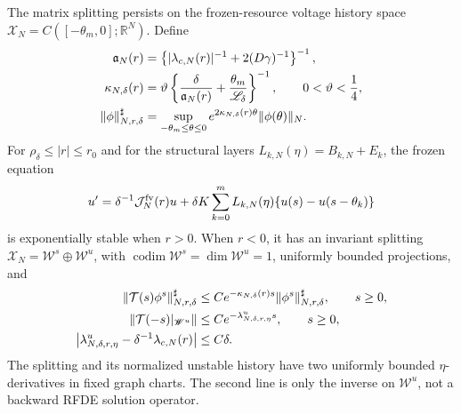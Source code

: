 \begin{proposition}
The matrix splitting persists on the frozen-resource voltage history space
\(\mathscr X_N=C([-\theta_m,0];\mathbb R^N)\).  Define
\begin{align}
 \mathfrak a_N(r)&=
 \left\{|\lambda_{c,N}(r)|^{-1}+2(D\gamma)^{-1}\right\}^{-1},\notag\\
 \kappa_{N,\delta}(r)&=\vartheta
 \left\{\frac\delta{\mathfrak a_N(r)}
          +\frac{\theta_m}{\mathscr L_\delta}\right\}^{-1},
 \qquad 0<\vartheta<\frac14,\notag\\
 \|\phi\|_{N,r,\delta}^{\sharp}
 &=\sup_{-\theta_m\le\theta\le0}
       e^{2\kappa_{N,\delta}(r)\theta}\|\phi(\theta)\|_N.
 \label{eq:anchor-toolkit-fading-norm}
\end{align}
For \(\rho_\delta\le|r|\le r_0\) and for the structural layers
\(L_{k,N}(\eta)=B_{k,N}+E_k\), the frozen equation
\begin{equation}
 u'=\delta^{-1}\mathcal J_N^{\rm fv}(r)u
 +\delta K\sum_{k=0}^mL_{k,N}(\eta)
       \{u(s)-u(s-\theta_k)\}
 \label{eq:anchor-toolkit-frozen-rfde}
\end{equation}
is exponentially stable when \(r>0\).  When \(r<0\), it has an invariant
splitting \(\mathscr X_N=\mathscr W^s\oplus\mathscr W^u\), with
\(\operatorname{codim}\mathscr W^s=\dim\mathscr W^u=1\), uniformly bounded
projections, and
\begin{align}
 \|\mathcal T(s)\phi^s\|_{N,r,\delta}^{\sharp}
 &\le Ce^{-\kappa_{N,\delta}(r)s}
       \|\phi^s\|_{N,r,\delta}^{\sharp},\qquad s\ge0,\notag\\
 \|\mathcal T(-s)|_{\mathscr W^u}\|
 &\le Ce^{-\lambda^u_{N,\delta,r,\eta}s},\qquad s\ge0,\notag\\
 \left|\lambda^u_{N,\delta,r,\eta}
       -\delta^{-1}\lambda_{c,N}(r)\right|&\le C\delta.
 \label{eq:anchor-toolkit-frozen-history-bounds}
\end{align}
The splitting and its normalized unstable history have two uniformly
bounded \(\eta\)-derivatives in fixed graph charts.  The second line is only
the inverse on \(\mathscr W^u\), not a backward RFDE solution operator.
\end{proposition}

